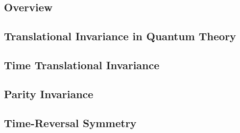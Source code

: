 \subsection{Overview}

\subsection{Translational Invariance in Quantum Theory}

\subsection{Time Translational Invariance}

\subsection{Parity Invariance}

\subsection{Time-Reversal Symmetry}
